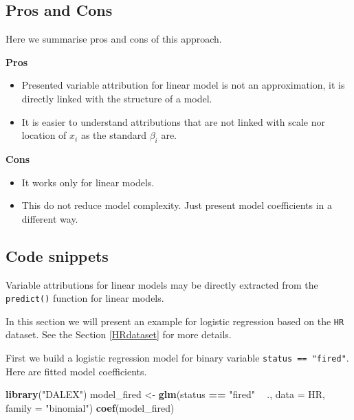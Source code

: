 \documentclass[]{krantz}
\newenvironment{Shaded}{\begin{snugshade}}{\end{snugshade}}
\newcommand{\DataTypeTok}[1]{\textcolor[rgb]{0.13,0.29,0.53}{#1}}
\newcommand{\KeywordTok}[1]{\textcolor[rgb]{0.13,0.29,0.53}{\textbf{#1}}}
\newcommand{\NormalTok}[1]{#1}
\newcommand{\OperatorTok}[1]{\textcolor[rgb]{0.81,0.36,0.00}{\textbf{#1}}}
\newcommand{\StringTok}[1]{\textcolor[rgb]{0.31,0.60,0.02}{#1}}
\providecommand{\tightlist}{%
  \setlength{\itemsep}{0pt}\setlength{\parskip}{0pt}}
\theoremstyle{definition}
\theoremstyle{definition}
\theoremstyle{definition}
\theoremstyle{remark}
\begin{document}
\hypertarget{pros-and-cons}{%
\subsection{Pros and Cons}\label{pros-and-cons}}

Here we summarise pros and cons of this approach.

\textbf{Pros}

\begin{itemize}
\tightlist
\item
  Presented variable attribution for linear model is not an
  approximation, it is directly linked with the structure of a model.
\item
  It is easier to understand attributions that are not linked with scale
  nor location of \(x_i\) as the standard \(\beta_i\) are.
\end{itemize}

\textbf{Cons}

\begin{itemize}
\tightlist
\item
  It works only for linear models.
\item
  This do not reduce model complexity. Just present model coefficients
  in a different way.
\end{itemize}

\hypertarget{code-snippets-1}{%
\subsection{Code snippets}\label{code-snippets-1}}

Variable attributions for linear models may be directly extracted from
the \texttt{predict()} function for linear models.

In this section we will present an example for logistic regression based
on the \texttt{HR} dataset. See the Section \ref{HRdataset} for more
details.

First we build a logistic regression model for binary variable
\texttt{status\ ==\ "fired"}. Here are fitted model coefficients.

\begin{Shaded}
\begin{Highlighting}[]
\KeywordTok{library}\NormalTok{(}\StringTok{"DALEX"}\NormalTok{)}
\NormalTok{model_fired <-}\StringTok{ }\KeywordTok{glm}\NormalTok{(status }\OperatorTok{==}\StringTok{ "fired"} \OperatorTok{~}\StringTok{ }\NormalTok{., }\DataTypeTok{data =}\NormalTok{ HR, }\DataTypeTok{family =} \StringTok{"binomial"}\NormalTok{)}
\KeywordTok{coef}\NormalTok{(model_fired)}
\end{Highlighting}
\end{Shaded}
\end{document}
